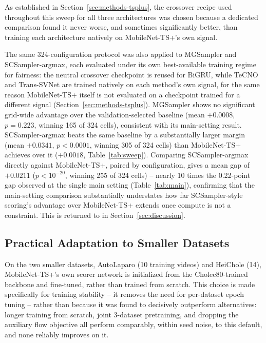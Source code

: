 \documentclass[preprint,12pt]{elsarticle}
\begin{document}
As established in Section~\ref{sec:methods-tsplus}, the crossover recipe used throughout this sweep for all three architectures was chosen because a dedicated comparison found it never worse, and sometimes significantly better, than training each architecture natively on MobileNet-TS+'s own signal.

The same 324-configuration protocol was also applied to MGSampler and SCSampler-argmax, each evaluated under its own best-available training regime for fairness: the neutral crossover checkpoint is reused for BiGRU, while TeCNO and Trans-SVNet are trained natively on each method's own signal, for the same reason MobileNet-TS+ itself is not evaluated on a checkpoint trained for a different signal (Section~\ref{sec:methods-tsplus}). MGSampler shows no significant grid-wide advantage over the validation-selected baseline (mean $+0.0008$, $p=0.223$, winning 165 of 324 cells), consistent with its main-setting result. SCSampler-argmax beats the same baseline by a substantially larger margin (mean $+0.0341$, $p<0.0001$, winning 305 of 324 cells) than MobileNet-TS+ achieves over it ($+0.0018$, Table~\ref{tab:sweep}). Comparing SCSampler-argmax directly against MobileNet-TS+, paired by configuration, gives a mean gap of $+0.0211$ ($p<10^{-20}$, winning 255 of 324 cells) -- nearly 10 times the 0.22-point gap observed at the single main setting (Table~\ref{tab:main}), confirming that the main-setting comparison substantially understates how far SCSampler-style scoring's advantage over MobileNet-TS+ extends once compute is not a constraint. This is returned to in Section~\ref{sec:discussion}.

\subsection{Practical Adaptation to Smaller Datasets}
\label{sec:results-data}

On the two smaller datasets, AutoLaparo (10 training videos) and HeiChole (14), MobileNet-TS+'s own scorer network is initialized from the Cholec80-trained backbone and fine-tuned, rather than trained from scratch. This choice is made specifically for training stability -- it removes the need for per-dataset epoch tuning -- rather than because it was found to decisively outperform alternatives: longer training from scratch, joint 3-dataset pretraining, and dropping the auxiliary flow objective all perform comparably, within seed noise, to this default, and none reliably improves on it.
\end{document}
